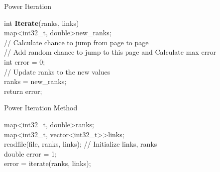 \documentclass{article}
\begin{document}
\LinesNumbered
\begin{algorithm}[h]
  \caption{Power Iteration\label{algC++}}
  int \textbf{Iterate}(ranks, links) \\ \Indp
  map\textless int32\_t, double\textgreater new\_ranks; \\
  // Calculate chance to jump from page to page \\
  // Add random chance to jump to this page and Calculate max error \\
  int error = 0; \\
  // Update ranks to the new values\\
  ranks = new\_ranks;\\
  return error;
\end{algorithm}

\LinesNumbered
\begin{algorithm}[h]
  \caption{Power Iteration Method\label{algC++}}
    map\textless int32\_t, double\textgreater ranks; \\
    map\textless int32\_t, vector\textless int32\_t\textgreater\textgreater links; \\
    readfile(file, ranks, links); // Initialize links, ranks  \\
    double error = 1;\\
     {
        error = iterate(ranks, links); \\
    }
    
\end{algorithm}
\end{document}
